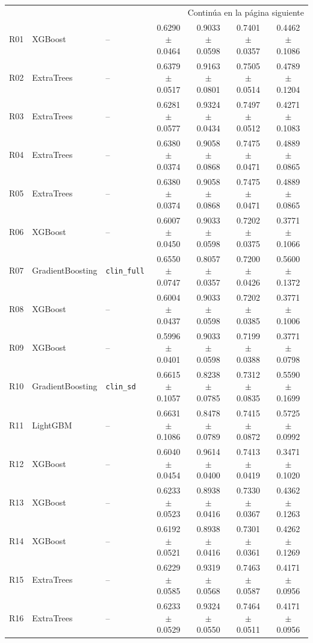 \begin{landscape}
\begin{longtable}{rllcccc}
\midrule
\multicolumn{7}{r}{Continúa en la página siguiente} \\
\endfoot
\bottomrule
\endlastfoot
R01 & XGBoost & -- & 0.6290 $\pm$ 0.0464 & 0.9033 $\pm$ 0.0598 & 0.7401 $\pm$ 0.0357 & 0.4462 $\pm$ 0.1086 \\
R02 & ExtraTrees & -- & 0.6379 $\pm$ 0.0517 & 0.9163 $\pm$ 0.0801 & 0.7505 $\pm$ 0.0514 & 0.4789 $\pm$ 0.1204 \\
R03 & ExtraTrees & -- & 0.6281 $\pm$ 0.0577 & 0.9324 $\pm$ 0.0434 & 0.7497 $\pm$ 0.0512 & 0.4271 $\pm$ 0.1083 \\
R04 & ExtraTrees & -- & 0.6380 $\pm$ 0.0374 & 0.9058 $\pm$ 0.0868 & 0.7475 $\pm$ 0.0471 & 0.4889 $\pm$ 0.0865 \\
R05 & ExtraTrees & -- & 0.6380 $\pm$ 0.0374 & 0.9058 $\pm$ 0.0868 & 0.7475 $\pm$ 0.0471 & 0.4889 $\pm$ 0.0865 \\
R06 & XGBoost & -- & 0.6007 $\pm$ 0.0450 & 0.9033 $\pm$ 0.0598 & 0.7202 $\pm$ 0.0375 & 0.3771 $\pm$ 0.1066 \\
R07 & GradientBoosting & \texttt{clin\_full} & 0.6550 $\pm$ 0.0747 & 0.8057 $\pm$ 0.0357 & 0.7200 $\pm$ 0.0426 & 0.5600 $\pm$ 0.1372 \\
R08 & XGBoost & -- & 0.6004 $\pm$ 0.0437 & 0.9033 $\pm$ 0.0598 & 0.7202 $\pm$ 0.0385 & 0.3771 $\pm$ 0.1006 \\
R09 & XGBoost & -- & 0.5996 $\pm$ 0.0401 & 0.9033 $\pm$ 0.0598 & 0.7199 $\pm$ 0.0388 & 0.3771 $\pm$ 0.0798 \\
R10 & GradientBoosting & \texttt{clin\_sd} & 0.6615 $\pm$ 0.1057 & 0.8238 $\pm$ 0.0785 & 0.7312 $\pm$ 0.0835 & 0.5590 $\pm$ 0.1699 \\
R11 & LightGBM & -- & 0.6631 $\pm$ 0.1086 & 0.8478 $\pm$ 0.0789 & 0.7415 $\pm$ 0.0872 & 0.5725 $\pm$ 0.0992 \\
R12 & XGBoost & -- & 0.6040 $\pm$ 0.0454 & 0.9614 $\pm$ 0.0400 & 0.7413 $\pm$ 0.0419 & 0.3471 $\pm$ 0.1020 \\
R13 & XGBoost & -- & 0.6233 $\pm$ 0.0523 & 0.8938 $\pm$ 0.0416 & 0.7330 $\pm$ 0.0367 & 0.4362 $\pm$ 0.1263 \\
R14 & XGBoost & -- & 0.6192 $\pm$ 0.0521 & 0.8938 $\pm$ 0.0416 & 0.7301 $\pm$ 0.0361 & 0.4262 $\pm$ 0.1269 \\
R15 & ExtraTrees & -- & 0.6229 $\pm$ 0.0585 & 0.9319 $\pm$ 0.0568 & 0.7463 $\pm$ 0.0587 & 0.4171 $\pm$ 0.0956 \\
R16 & ExtraTrees & -- & 0.6233 $\pm$ 0.0529 & 0.9324 $\pm$ 0.0550 & 0.7464 $\pm$ 0.0511 & 0.4171 $\pm$ 0.0956 \\

\end{longtable}
\end{landscape}
